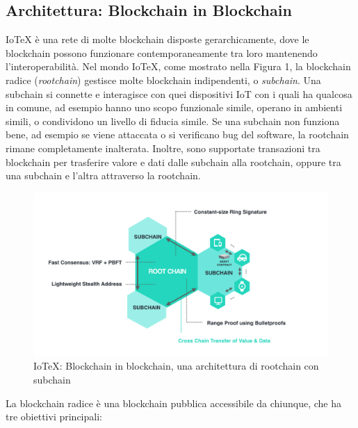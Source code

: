 \documentclass[a4paper,12pt]{article}
\begin{document}
\subsection{Architettura: Blockchain in Blockchain}
IoTeX è una rete di molte blockchain disposte gerarchicamente, dove le blockchain possono funzionare contemporaneamente tra loro mantenendo l'interoperabilità. Nel mondo IoTeX, come mostrato nella Figura 1, la blockchain radice (\emph{rootchain}) gestisce molte blockchain indipendenti, o \emph{subchain}. Una subchain si connette e interagisce con quei dispositivi IoT con i quali ha qualcosa in comune, ad esempio hanno uno scopo funzionale simile, operano in
ambienti simili, o condividono un livello di fiducia simile. Se una subchain non funziona bene, ad esempio se viene attaccata o si verificano bug del software, la rootchain rimane completamente inalterata. Inoltre, sono supportate transazioni tra blockchain per trasferire valore e dati dalle subchain alla rootchain, oppure tra una subchain e l'altra attraverso la rootchain.

\begin{figure}[h]
	\includegraphics[width=\textwidth]{Figura1.png}
	\caption{IoTeX: Blockchain in blockchain, una architettura di rootchain con subchain}
\end{figure}

La blockchain radice è una blockchain pubblica accessibile da chiunque, che ha tre obiettivi principali:
\end{document}
